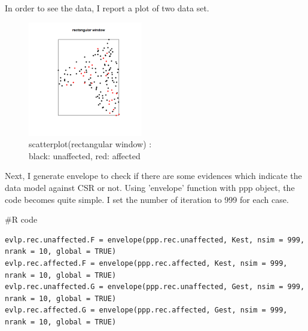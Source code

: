 \documentclass{article}
\newenvironment{Rcode}%
{%
    \begin{mdframed}
    \#R code
    \begin{small}
}
{%
    \end{small}
    \end{mdframed}
}
\begin{document}
In order to see the data, I report a plot of two data set.

\clearpage
\begin{figure}[!h]
    \centering
    \includegraphics[width=5cm]{prob1_rectangular_window_scatterplot.png}
    \caption{scatterplot(rectangular window) : \\black: unaffected, red: affected}
\end{figure}


Next, I generate envelope to check if there are some evidences which indicate the data model against CSR or not.
Using 'envelope' function with ppp object, the code becomes quite simple. I set the number of iteration to 999 for each case.

\begin{Rcode}
    \begin{verbatim}
evlp.rec.unaffected.F = envelope(ppp.rec.unaffected, Kest, nsim = 999, nrank = 10, global = TRUE)
evlp.rec.affected.F = envelope(ppp.rec.affected, Kest, nsim = 999, nrank = 10, global = TRUE)
evlp.rec.unaffected.G = envelope(ppp.rec.unaffected, Gest, nsim = 999, nrank = 10, global = TRUE)
evlp.rec.affected.G = envelope(ppp.rec.affected, Gest, nsim = 999, nrank = 10, global = TRUE)
    \end{verbatim}
\end{Rcode}
\end{document}
